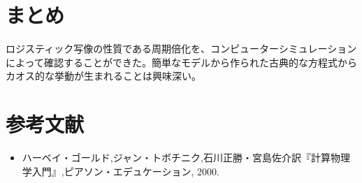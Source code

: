 \documentclass{jsarticle}
\begin{document}
\begin{enumerate}
\begin{enumerate}
\begin{figure}[H]
\begin{center}
\begin{tabular}{cc}
     
     \end{tabular}
    \end{center}
    \end{figure}

  \end{enumerate}
  
\end{enumerate}

\section{まとめ}
ロジスティック写像の性質である周期倍化を、コンピューターシミュレーションによって確認することができた。簡単なモデルから作られた古典的な方程式からカオス的な挙動が生まれることは興味深い。

\section{参考文献}
\begin{itemize}
 \item ハーベイ・ゴールド,ジャン・トボチニク,石川正勝・宮島佐介訳『計算物理学入門』,ピアソン・エデュケーション, 2000.
\end{itemize}
\end{document}
